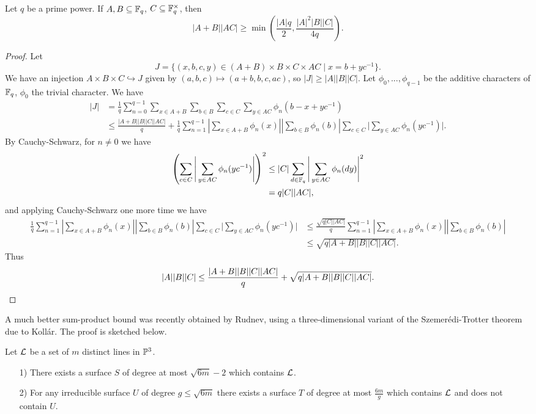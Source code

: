 \begin{thm}[Garaev] Let $q$ be a prime power. If $A,B\subseteq \mathbb{F}_q$, $C \subseteq \mathbb{F}_q^\times$, then
\[
|A+B||AC| \ge \min\left(\frac{|A|q}{2},\frac{|A|^2|B||C|}{4q}\right).
\]
\end{thm}
\begin{proof} Let
\[
J = \{(x,b,c,y)\in (A+B)\times B \times C\times AC\mid x = b + yc^{-1}\}.
\]
We have an injection $A\times B\times C\hookrightarrow J$ given by $(a,b,c)\mapsto (a+b,b,c,ac)$, so $|J| \ge |A||B||C|$. Let $\phi_0, ..., \phi_{q-1}$ be the additive characters of $\mathbb{F}_q$, $\phi_0$ the trivial character. We have
\begin{align*}
|J| &= \frac{1}{q}\sum_{n=0}^{q-1}\sum_{x\in A+B}\sum_{b\in B}\sum_{c\in C}\sum_{y\in AC} \phi_n(b-x+yc^{-1})\\
&\le \frac{|A+B||B||C||AC|}{q} + \frac{1}{q}\sum_{n=1}^{q-1}\left|\sum_{x\in A+B}\phi_n(x)\right|\left|\sum_{b\in B}\phi_n(b)\right|\sum_{c\in C}\Bigg|\sum_{y\in AC}\phi_n(yc^{-1})\Bigg|.
\end{align*}
By Cauchy-Schwarz, for $n \ne 0$ we have
\begin{align*}
\left(\sum_{c\in C}\Bigg|\sum_{y\in AC}\phi_n(yc^{-1})\Bigg|\right)^2 &\le |C|\sum_{d\in \mathbb{F}_q}\Bigg|\sum_{y\in AC} \phi_n(dy)\Bigg|^2\\
&= q|C||AC|,
\end{align*}
and applying Cauchy-Schwarz one more time we have
\begin{align*}
\frac{1}{q}\sum_{n=1}^{q-1}\left|\sum_{x\in A+B}\phi_n(x)\right|\left|\sum_{b\in B}\phi_n(b)\right|\sum_{c\in C}\Bigg|\sum_{y\in AC}\phi_n(yc^{-1})\Bigg| &\le \frac{\sqrt{q|C||AC|}}{q}\sum_{n=1}^{q-1}\left|\sum_{x\in A+B}\phi_n(x)\right|\left|\sum_{b\in B}\phi_n(b)\right|\\
&\le \sqrt{q|A+B||B||C||AC|}.
\end{align*}
Thus
\[
|A||B||C| \le \frac{|A+B||B||C||AC|}{q} + \sqrt{q|A+B||B||C||AC|}.\qedhere
\]
\end{proof}

A much better sum-product bound was recently obtained by Rudnev, using a three-dimensional variant of the Szemer\'edi-Trotter theorem due to Koll\'ar. The proof is sketched below.

\begin{lem}[Koll\'ar]\label{dimension} Let $\mathcal{L}$ be a set of $m$ distinct lines in $\mathbb{P}^3$.
\begin{itemize}
\item[1)] There exists a surface $S$ of degree at most $\sqrt{6m}-2$ which contains $\mathcal{L}$.
\item[2)] For any irreducible surface $U$ of degree $g \le \sqrt{6m}$ there exists a surface $T$ of degree at most $\frac{6m}{g}$ which contains $\mathcal{L}$ and does not contain $U$.
\end{itemize}
\end{lem}

